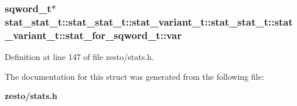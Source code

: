 \subsubsection[{var}]{\setlength{\rightskip}{0pt plus 5cm}sqword\_\-t$\ast$ stat\_\-stat\_\-t::stat\_\-stat\_\-t::stat\_\-variant\_\-t::stat\_\-stat\_\-t::stat\_\-variant\_\-t::stat\_\-for\_\-sqword\_\-t::var}\label{structstat__stat__t_1_1stat__variant__t_1_1stat__for__sqword__t_d9a3d1c90ac2c5e14012a39df4b0620d}




Definition at line 147 of file zesto/stats.h.

The documentation for this struct was generated from the following file:\begin{CompactItemize}
\item 
{\bf zesto/stats.h}\end{CompactItemize}
